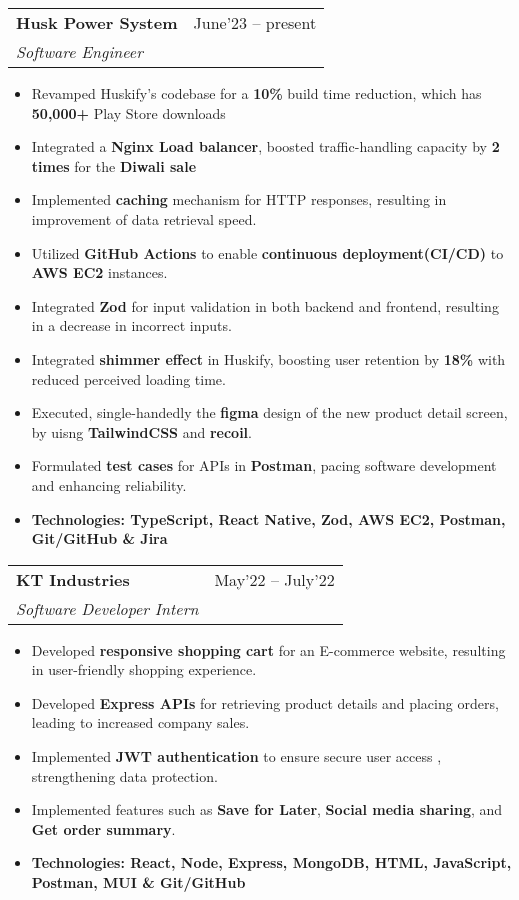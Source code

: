 \documentclass[letterpaper,11pt]{article}
\makeatletter
\newcommand{\resumeItem}[1]{
  \item\small{
    {#1 \vspace{-2pt}}
  }
}
\newcommand{\resumeSubheading}[4]{
  \vspace{-2pt}\item
    \begin{tabular*}{0.97\textwidth}[t]{l@{\extracolsep{\fill}}r}
      \textbf{#1} & #2 \\
      \textit{\small#3} & \textit{\small #4} \\
    \end{tabular*}\vspace{-7pt}
}
\newcommand{\resumeSubSubheading}[2]{
    \item
    \begin{tabular*}{0.97\textwidth}{l@{\extracolsep{\fill}}r}
      \textit{\small#1} & \textit{\small #2} \\
    \end{tabular*}\vspace{-7pt}
}
\newcommand{\resumeSubHeadingListEnd}{\end{itemize}}
\newcommand{\resumeItemListStart}{\begin{itemize}}
\newcommand{\resumeItemListEnd}{\end{itemize}\vspace{-5pt}}
\makeatother
\begin{document}
    \resumeSubheading
      {Husk Power System}{June'23 -- present}
      {Software Engineer}{}
      \resumeItemListStart
        \resumeItem{Revamped Huskify's codebase for a \textbf{10\%} build time reduction, which has \textbf{50,000+} Play Store downloads}
        \resumeItem{Integrated a \textbf{Nginx Load balancer}, boosted traffic-handling capacity by \textbf{2 times} for the \textbf{Diwali sale}}
        \resumeItem{Implemented \textbf{caching} mechanism for HTTP responses, resulting in improvement of data retrieval speed.}
        \resumeItem{Utilized \textbf{GitHub Actions} to enable \textbf{continuous deployment(CI/CD)} to \textbf{AWS EC2} instances.}
        \resumeItem{Integrated \textbf{Zod} for input validation in both backend and frontend, resulting in a decrease in incorrect inputs.}
        \resumeItem{Integrated \textbf{shimmer effect} in Huskify, boosting user retention by \textbf{18\%} with reduced perceived loading time.}
        \resumeItem{Executed, single-handedly the \textbf{figma} design of the new product detail screen, by uisng \textbf{TailwindCSS} and \textbf{recoil}.}
        \resumeItem{Formulated \textbf{test cases} for APIs in \textbf{Postman}, pacing software development and enhancing reliability.}
        
        \resumeItem{\textbf{Technologies: TypeScript, React Native, Zod, AWS EC2, Postman, Git/GitHub \& Jira}}
      \resumeItemListEnd

    \resumeSubheading
      {KT Industries}{May'22 -- July'22}
      {Software Developer Intern}{}
      \resumeItemListStart
        \resumeItem{Developed \textbf{responsive shopping cart} for an E-commerce website, resulting in user-friendly shopping experience.}
        \resumeItem{Developed \textbf{Express APIs} for retrieving product details and placing orders, leading to increased company sales.}
        \resumeItem{Implemented \textbf{JWT authentication} to ensure secure user access , strengthening data protection.}
        \resumeItem{Implemented features such as \textbf{Save for Later}, \textbf{Social media sharing}, and \textbf{Get order summary}.}
        \resumeItem{\textbf{Technologies: React, Node, Express, MongoDB, HTML, JavaScript, Postman, MUI \& Git/GitHub}}
      \resumeItemListEnd
      
\end{document}
